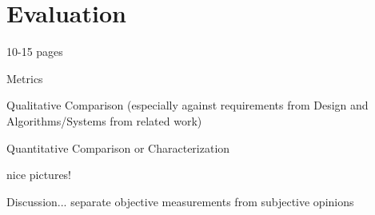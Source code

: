 \chapter{Evaluation}

10-15 pages

Metrics

Qualitative Comparison
(especially against requirements from Design and Algorithms/Systems from related work)

Quantitative Comparison or Characterization

nice pictures!

Discussion...
separate objective measurements from subjective opinions
